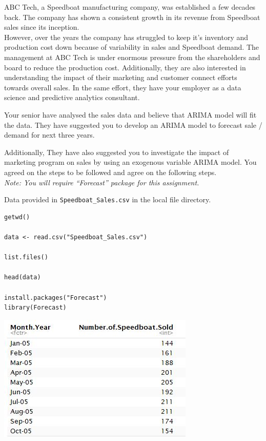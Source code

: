 \documentclass[a4paper,12pt]{article}
\begin{document}
\large 
\noindent ABC Tech, a Speedboat manufacturing company, was established a few decades back. The
company has shown a consistent growth in its revenue from Speedboat sales since its inception.\\

\noindent However, over the years the company has struggled to keep it’s inventory and production cost
down because of variability in sales and Speedboat demand. The management at ABC Tech is
under enormous pressure from the shareholders and board to reduce the production cost.
Additionally, they are also interested in understanding the impact of their marketing and
customer connect efforts towards overall sales. In the same effort, they have your employer as
a data science and predictive analytics consultant.\\
\medskip

\noindent Your senior have analysed the sales data and believe that ARIMA model will fit the data. They have  suggested you to develop an ARIMA model to forecast sale / demand for next three years.\\
\medskip

\noindent
Additionally, They have  also suggested you to investigate the impact of marketing program on
sales by using an exogenous variable ARIMA model. You agreed on the steps to be followed
and agree on the following steps.\\

\noindent \textit{Note: You will require “Forecast” package for this assignment.}

\newpage 
\noindent Data provided in \texttt{Speedboat\_Sales.csv} in the local file directory.


\begin{framed}
\begin{verbatim}
getwd()

data <- read.csv("Speedboat_Sales.csv")

list.files()

head(data)

install.packages("Forecast")
library(Forecast)

\end{verbatim}
\end{framed}


\newpage 

\includegraphics[scale=1.1]{00-B2/images/Speedboat_data.JPG}
\end{document}

